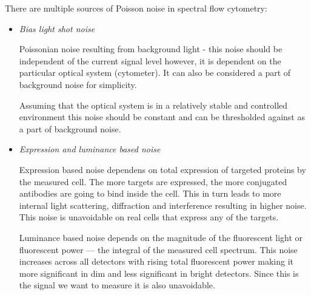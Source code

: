 There are multiple sources of Poisson noise in spectral flow cytometry:
\begin{itemize}
    \item \emph{Bias light shot noise}
    
    Poissonian noise resulting from background light - this noise should be independent of the current signal level however, it is dependent on the particular optical system (cytometer)\cite{PosNoiseSteen92}. 
    It can also be considered a part of background noise for simplicity.
    
    Assuming that the optical system is in a relatively stable and controlled environment this noise should be constant and can be thresholded against as a part of background noise.
    
    \item \emph{Expression and luminance based noise}
    
    Expression based noise dependens on total expression of targeted proteins by the measured cell. 
    The more targets are expressed, the more conjugated antibodies are going to bind inside the cell. This in turn leads to more internal light scattering, diffraction and interference resulting in higher noise\cite{noise1985}. This noise is unavoidable on real cells that express any of the targets.
    
    Luminance based noise depends on the magnitude of the fluorescent light or fluorescent power --- the integral of the measured cell spectrum. This noise increases across all detectors with rising total fluorescent power making it more significant in dim and less significant in bright detectors\cite{PosNoiseSteen92}. 
    Since this is the signal we want to measure it is also unavoidable. 
\end{itemize}